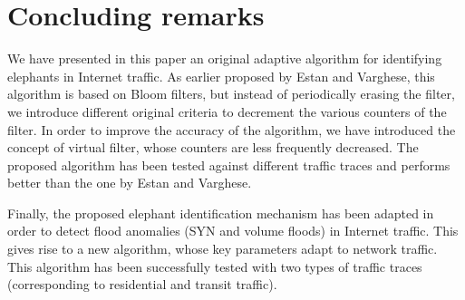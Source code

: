 \documentclass{amsart}
\begin{document}
\section{Concluding remarks}
\label{conclusion}

We have presented  in this paper an original adaptive  algorithm for identifying elephants
in Internet traffic. As earlier proposed by Estan and Varghese, this algorithm is based on
Bloom  filters, but instead  of periodically  erasing the  filter, we  introduce different
original criteria to decrement the various counters of the filter. In order to improve the accuracy
of the  algorithm, we have  introduced the concept  of virtual filter, whose  counters are
less  frequently decreased.  The  proposed  algorithm has  been  tested against  different
traffic traces and performs better than the one by Estan and Varghese.

Finally, the  proposed elephant  identification mechanism  has been adapted  in order  to detect
flood  anomalies (SYN  and volume  floods) in  Internet traffic.  This gives  rise to  a new
algorithm,  whose  key  parameters adapt  to  network  traffic.  This algorithm  has  been
successfully  tested  with   two  types  of  traffic traces  (corresponding  to
residential  and transit traffic).
\end{document}
